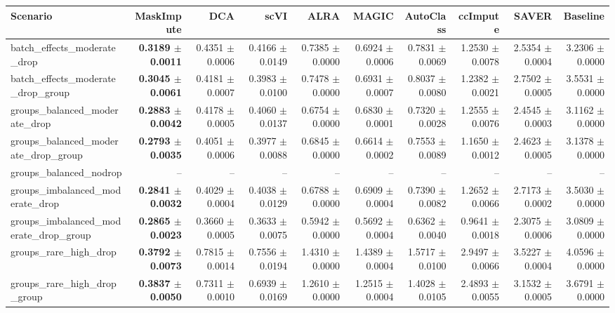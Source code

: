 \begin{tabular}{@{}lrrrrrrrrr@{}}
\toprule
Scenario & MaskImpute & DCA & scVI & ALRA & MAGIC & AutoClass & ccImpute & SAVER & Baseline \\
\midrule
batch\_effects\_moderate\_drop & \textbf{0.3189 $\pm$ 0.0011} & 0.4351 $\pm$ 0.0006 & 0.4166 $\pm$ 0.0149 & 0.7385 $\pm$ 0.0000 & 0.6924 $\pm$ 0.0006 & 0.7831 $\pm$ 0.0069 & 1.2530 $\pm$ 0.0078 & 2.5354 $\pm$ 0.0004 & 3.2306 $\pm$ 0.0000 \\
batch\_effects\_moderate\_drop\_group & \textbf{0.3045 $\pm$ 0.0061} & 0.4181 $\pm$ 0.0007 & 0.3983 $\pm$ 0.0100 & 0.7478 $\pm$ 0.0000 & 0.6931 $\pm$ 0.0007 & 0.8037 $\pm$ 0.0080 & 1.2382 $\pm$ 0.0021 & 2.7502 $\pm$ 0.0005 & 3.5531 $\pm$ 0.0000 \\
groups\_balanced\_moderate\_drop & \textbf{0.2883 $\pm$ 0.0042} & 0.4178 $\pm$ 0.0005 & 0.4060 $\pm$ 0.0137 & 0.6754 $\pm$ 0.0000 & 0.6830 $\pm$ 0.0001 & 0.7320 $\pm$ 0.0028 & 1.2555 $\pm$ 0.0076 & 2.4545 $\pm$ 0.0003 & 3.1162 $\pm$ 0.0000 \\
groups\_balanced\_moderate\_drop\_group & \textbf{0.2793 $\pm$ 0.0035} & 0.4051 $\pm$ 0.0006 & 0.3977 $\pm$ 0.0088 & 0.6845 $\pm$ 0.0000 & 0.6614 $\pm$ 0.0002 & 0.7553 $\pm$ 0.0089 & 1.1650 $\pm$ 0.0012 & 2.4623 $\pm$ 0.0005 & 3.1378 $\pm$ 0.0000 \\
groups\_balanced\_nodrop & -- & -- & -- & -- & -- & -- & -- & -- & -- \\
groups\_imbalanced\_moderate\_drop & \textbf{0.2841 $\pm$ 0.0032} & 0.4029 $\pm$ 0.0004 & 0.4038 $\pm$ 0.0129 & 0.6788 $\pm$ 0.0000 & 0.6909 $\pm$ 0.0004 & 0.7390 $\pm$ 0.0082 & 1.2652 $\pm$ 0.0066 & 2.7173 $\pm$ 0.0002 & 3.5030 $\pm$ 0.0000 \\
groups\_imbalanced\_moderate\_drop\_group & \textbf{0.2865 $\pm$ 0.0023} & 0.3660 $\pm$ 0.0005 & 0.3633 $\pm$ 0.0075 & 0.5942 $\pm$ 0.0000 & 0.5692 $\pm$ 0.0004 & 0.6362 $\pm$ 0.0040 & 0.9641 $\pm$ 0.0018 & 2.3075 $\pm$ 0.0006 & 3.0809 $\pm$ 0.0000 \\
groups\_rare\_high\_drop & \textbf{0.3792 $\pm$ 0.0073} & 0.7815 $\pm$ 0.0014 & 0.7556 $\pm$ 0.0194 & 1.4310 $\pm$ 0.0000 & 1.4389 $\pm$ 0.0004 & 1.5717 $\pm$ 0.0100 & 2.9497 $\pm$ 0.0066 & 3.5227 $\pm$ 0.0004 & 4.0596 $\pm$ 0.0000 \\
groups\_rare\_high\_drop\_group & \textbf{0.3837 $\pm$ 0.0050} & 0.7311 $\pm$ 0.0010 & 0.6939 $\pm$ 0.0169 & 1.2610 $\pm$ 0.0000 & 1.2515 $\pm$ 0.0004 & 1.4028 $\pm$ 0.0105 & 2.4893 $\pm$ 0.0055 & 3.1532 $\pm$ 0.0005 & 3.6791 $\pm$ 0.0000 \\

\end{tabular}
